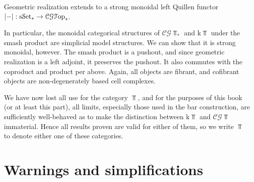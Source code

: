 \begin{proposition}\label{prp:6.1}
	Geometric realization extends to a strong monoidal left Quillen functor $\left| - \right| : \mathrm{s}\mathcal{S}\mathrm{et}_* \to \mathcal{C} \mathcal{G} \mathcal{T}\mathrm{op} _*$.
\end{proposition}

In particular, the monoidal categorical structures of $\mathcal{C} \mathcal{G} \Top_*$ and $\mathrm{k} \Top $ under the smash product are simplicial model structures. We can show that it is strong monoidal, however. The smash product is a pushout, and since geometric realization is a left adjoint, it preserves the pushout. It also commutes with the coproduct and product per above. Again, all objects are fibrant, and cofibrant objects are non-degenerately based cell complexes.

We have now lost all use for the category $\Top $, and for the purposes of this book (or at least this part), all limits, especially those used in the bar construction, are sufficiently well-behaved as to make the distinction between $\mathrm{k} \Top $ and $\mathcal{C} \mathcal{G} \Top $ immaterial. Hence all results proven are valid for either of them, so we write $\Top $ to denote either one of these categories.

\section{Warnings and simplifications}

